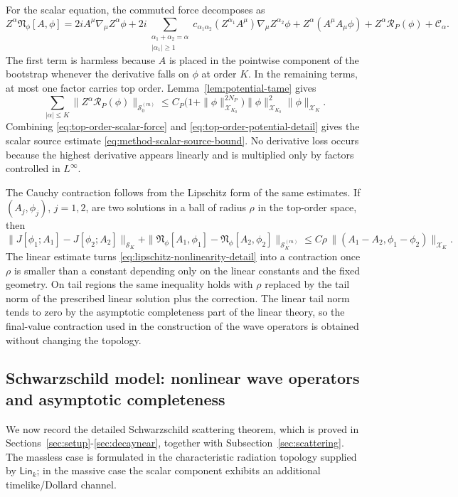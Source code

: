 \documentclass[11pt]{article}
\numberwithin{equation}{section}
\theoremstyle{plain}
\theoremstyle{definition}
\theoremstyle{remark}
\newcommand{\Lin}{\mathsf{Lin}}
\begin{document}
For the scalar equation, the commuted force decomposes as
\begin{equation}\label{eq:top-order-scalar-force}
Z^\alpha \mathfrak N_\phi[A,\phi]
=
2iA^\mu \nabla_\mu Z^\alpha\phi
+
2i\sum_{\substack{\alpha_1+\alpha_2=\alpha\\ |\alpha_1|\ge1}}
 c_{\alpha_1\alpha_2}(Z^{\alpha_1}A^\mu)\nabla_\mu Z^{\alpha_2}\phi
+
Z^\alpha(A^\mu A_\mu\phi)
+Z^\alpha\mathcal R_P(\phi)
+\mathcal C_\alpha.
\end{equation}
The first term is harmless because $A$ is placed in the pointwise component of the bootstrap whenever the derivative falls on $\phi$ at order $K$. In the remaining terms, at most one factor carries top order. Lemma~\ref{lem:potential-tame} gives
\begin{equation}\label{eq:top-order-potential-detail}
\sum_{|\alpha|\le K}\|Z^\alpha\mathcal R_P(\phi)\|_{\mathcal S_0^{(m)}}
\le
C_P\bigl(1+\|\phi\|_{\mathcal X_{K_0}}^{2N_P}\bigr)
\|\phi\|_{\mathcal X_{K_0}}^2\|\phi\|_{\mathcal X_K}.
\end{equation}
Combining \eqref{eq:top-order-scalar-force} and \eqref{eq:top-order-potential-detail} gives the scalar source estimate \eqref{eq:method-scalar-source-bound}. No derivative loss occurs because the highest derivative appears linearly and is multiplied only by factors controlled in $L^\infty$.

The Cauchy contraction follows from the Lipschitz form of the same estimates. If $(A_j,\phi_j)$, $j=1,2$, are two solutions in a ball of radius $\rho$ in the top-order space, then
\begin{equation}\label{eq:lipschitz-nonlinearity-detail}
\|J[\phi_1;A_1]-J[\phi_2;A_2]\|_{\mathcal S_K}
+
\|\mathfrak N_\phi[A_1,\phi_1]-\mathfrak N_\phi[A_2,\phi_2]\|_{\mathcal S_K^{(m)}}
\le C\rho\,
\|(A_1-A_2,\phi_1-\phi_2)\|_{\mathcal X_K}.
\end{equation}
The linear estimate turns \eqref{eq:lipschitz-nonlinearity-detail} into a contraction once $\rho$ is smaller than a constant depending only on the linear constants and the fixed geometry. On tail regions the same inequality holds with $\rho$ replaced by the tail norm of the prescribed linear solution plus the correction. The linear tail norm tends to zero by the asymptotic completeness part of the linear theory, so the final-value contraction used in the construction of the wave operators is obtained without changing the topology.


\subsection{Schwarzschild model: nonlinear wave operators and asymptotic completeness}\label{subsec:schwarzschild-wave-ops}
We now record the detailed Schwarzschild scattering theorem, which is proved in Sections~\ref{sec:setup}-\ref{sec:decaynear}, together with Subsection~\ref{sec:scattering}.  The massless case is formulated in the characteristic radiation topology supplied by $\Lin_k$; in the massive case the scalar component exhibits an additional timelike/Dollard channel.
\end{document}
